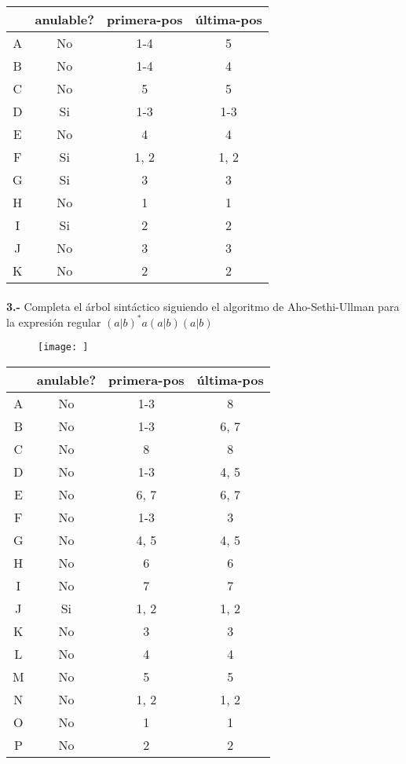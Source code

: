 \documentclass[11pt,a4paper]{report}
\begin{document}
\begin{tabular} {| c | c | c | c |}\hline
 & anulable? & primera-pos & última-pos\\ \hline
A & No & 1-4 & 5\\ \hline
B & No & 1-4 & 4\\ \hline
C & No & 5 & 5\\ \hline
D & Si & 1-3 & 1-3\\ \hline
E & No & 4 & 4\\ \hline
F & Si & 1, 2 & 1, 2\\ \hline
G & Si & 3 & 3\\ \hline
H & No & 1 & 1\\ \hline
I & Si & 2 & 2\\ \hline
J & No & 3 & 3\\ \hline
K & No & 2 & 2\\ \hline
\end{tabular}\paragraph{}
\textbf{3.-} Completa el árbol sintáctico siguiendo el algoritmo de Aho-Sethi-Ullman para la expresión regular $ (a|b)^*a(a|b)(a|b) $
\begin{figure}[ht!]
\centering
\texttt{[image: ]}
\end{figure}

\begin{tabular} {| c | c | c | c |}\hline
 & anulable? & primera-pos & última-pos\\ \hline
A & No & 1-3 & 8\\ \hline
B & No & 1-3 & 6, 7\\ \hline
C & No & 8 & 8\\ \hline
D & No & 1-3 & 4, 5\\ \hline
E & No & 6, 7 & 6, 7\\ \hline
F & No & 1-3 & 3\\ \hline
G & No & 4, 5 & 4, 5\\ \hline
H & No & 6 & 6\\ \hline
I & No & 7 & 7\\ \hline
J & Si & 1, 2 & 1, 2\\ \hline
K & No & 3 & 3\\ \hline
L & No & 4 & 4\\ \hline
M & No & 5 & 5\\ \hline
N & No & 1, 2 & 1, 2\\ \hline
O & No & 1 & 1\\ \hline
P & No & 2 & 2\\ \hline
\end{tabular}
\end{document}
